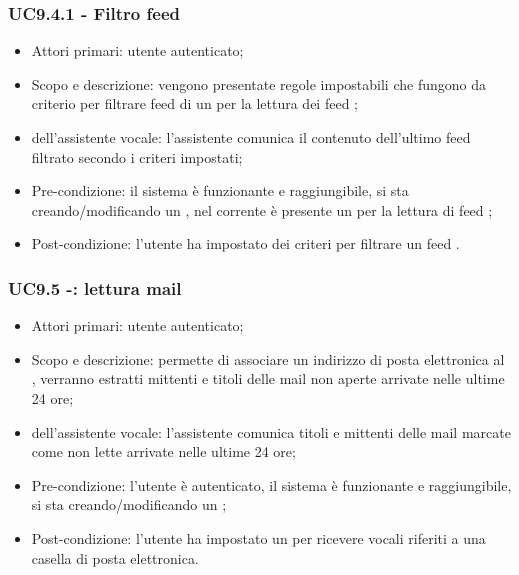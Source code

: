 \subsubsection{UC9.4.1 - Filtro feed }
\begin{itemize}
	\item  Attori primari: utente autenticato;
	\item  Scopo e descrizione: vengono presentate regole impostabili che fungono da criterio per filtrare feed  di un  per la lettura dei feed ;
	\item  {} dell'assistente vocale: l'assistente comunica il contenuto dell'ultimo feed  filtrato secondo i criteri impostati;
	\item  Pre-condizione: il sistema è funzionante e raggiungibile, si sta creando/modificando un , nel  corrente è presente un  per la lettura di feed ;
	\item  Post-condizione: l'utente ha impostato dei criteri per filtrare un feed .
\end{itemize}
\subsubsection{UC9.5 -: lettura mail}
\begin{itemize}
	\item  Attori primari: utente autenticato;
	\item  Scopo e descrizione: permette di associare un indirizzo di posta elettronica al , verranno estratti mittenti e titoli delle mail non aperte arrivate nelle ultime 24 ore;
	\item  {} dell'assistente vocale: l'assistente comunica titoli e mittenti delle mail marcate come non lette arrivate nelle ultime 24 ore;
	\item  Pre-condizione: l'utente è autenticato, il sistema è funzionante e raggiungibile, si sta creando/modificando un ;
	\item  Post-condizione: l'utente ha impostato un  per ricevere  vocali riferiti a una casella di posta elettronica.
\end{itemize}
